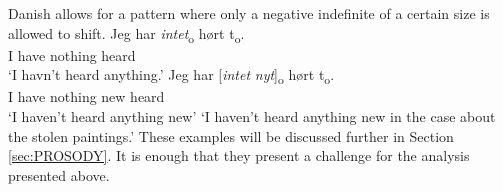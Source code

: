\documentclass[12pt, letterpaper]{article}
\begin{document}
Danish allows for a pattern where only a negative indefinite of a certain size is allowed to shift. 
	\ea
		\ea 
		\gll Jeg har \textit{intet}\textsubscript{o} hørt t\textsubscript{o}.\\
		I have nothing heard\\
		\glt  `I havn't heard anything.'
		\ex 
		\gll Jeg har [\textit{intet} \textit{nyt}]\textsubscript{o} hørt t\textsubscript{o}.\\
		I have nothing new heard\\
		\glt `I haven't heard anything new'
		\glt `I haven't heard anything new in the case about the stolen paintings.'
		\z 
	\z
These examples will be discussed further in Section \ref{sec:PROSODY}. It is enough that they present a challenge for the analysis presented above.
\end{document}
